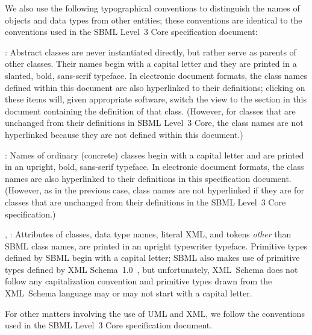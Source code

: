 \documentclass[draftspec]{sbmlpkgspec}
\begin{document}
We also use the following typographical conventions to distinguish the
names of objects and data types from other entities; these conventions
are identical to the conventions used in the SBML Level~3 Core specification
document:

\begin{description}
  
\item {}: Abstract classes are never
  instantiated directly, but rather serve as parents of other classes.
  Their names begin with a capital letter and they are printed in a
  slanted, bold, sans-serif typeface.  In electronic document formats,
  the class names defined within this document are also hyperlinked to
  their definitions; clicking on these items will, given appropriate
  software, switch the view to the section in this document containing
  the definition of that class.  (However, for classes that are
  unchanged from their definitions in SBML Level~3 Core, the class names
  are not hyperlinked because they are not defined within this
  document.)
  
\item {}: Names of ordinary (concrete) classes begin with a
  capital letter and are printed in an upright, bold, sans-serif
  typeface.  In electronic document formats, the class names are also
  hyperlinked to their definitions in this specification document.
  (However, as in the previous case, class names are not hyperlinked if
  they are for classes that are unchanged from their definitions in the
  SBML Level~3 Core specification.)

\item {}, : Attributes of classes, data
  type names, literal XML, and tokens \emph{other} than SBML class
  names, are printed in an upright typewriter typeface.  Primitive types
  defined by SBML begin with a capital letter; SBML also makes use of
  primitive types defined by XML
  Schema~1.0~\citep{biron:2000,fallside:2000,thompson:2000}, but
  unfortunately, XML~Schema does not follow any capitalization
  convention and primitive types drawn from the XML~Schema language may
  or may not start with a capital letter.

\end{description}

For other matters involving the use of UML and XML, we follow the
conventions used in the SBML Level~3 Core specification document.  
\end{document}
